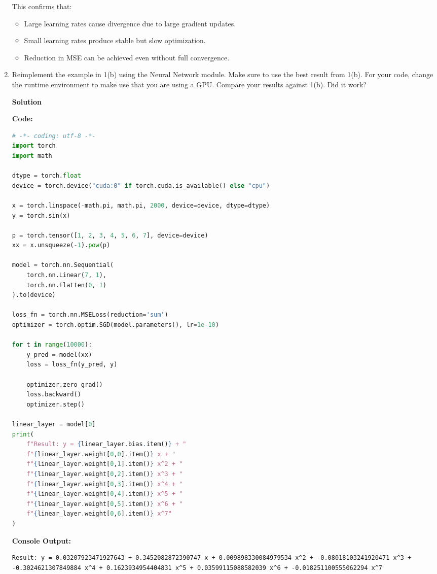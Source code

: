 \documentclass[10pt]{article}
\begin{document}
\begin{enumerate}[label=\textbf{1(\alph*)}]
This confirms that:
\begin{itemize}
    \item Large learning rates cause divergence due to large gradient updates.
    \item Small learning rates produce stable but slow optimization.
    \item Reduction in MSE can be achieved even without full convergence.
\end{itemize}

\newpage
    \item Reimplement the example in 1(b) using the Neural Network module. Make sure to use the best result from 1(b). For your code, change the runtime environment to make use that you are using a GPU. Compare your results against 1(b). Did it work?

\textbf{Solution}

\textbf{Code:}
\begin{lstlisting}[language=Python]
# -*- coding: utf-8 -*-
import torch
import math

dtype = torch.float
device = torch.device("cuda:0" if torch.cuda.is_available() else "cpu")

x = torch.linspace(-math.pi, math.pi, 2000, device=device, dtype=dtype)
y = torch.sin(x)

p = torch.tensor([1, 2, 3, 4, 5, 6, 7], device=device)
xx = x.unsqueeze(-1).pow(p)

model = torch.nn.Sequential(
    torch.nn.Linear(7, 1),
    torch.nn.Flatten(0, 1)
).to(device)

loss_fn = torch.nn.MSELoss(reduction='sum')
optimizer = torch.optim.SGD(model.parameters(), lr=1e-10)

for t in range(10000):
    y_pred = model(xx)
    loss = loss_fn(y_pred, y)

    optimizer.zero_grad()
    loss.backward()
    optimizer.step()

linear_layer = model[0]
print(
    f"Result: y = {linear_layer.bias.item()} + "
    f"{linear_layer.weight[0,0].item()} x + "
    f"{linear_layer.weight[0,1].item()} x^2 + "
    f"{linear_layer.weight[0,2].item()} x^3 + "
    f"{linear_layer.weight[0,3].item()} x^4 + "
    f"{linear_layer.weight[0,4].item()} x^5 + "
    f"{linear_layer.weight[0,5].item()} x^6 + "
    f"{linear_layer.weight[0,6].item()} x^7"
)
\end{lstlisting}

\textbf{Console Output:}
\begin{lstlisting}
Result: y = 0.03207923471927643 + 0.3452082872390747 x + 0.009898330084979534 x^2 + -0.08018103241920471 x^3 + -0.3024621307849884 x^4 + 0.1623934954404831 x^5 + 0.03599115088582039 x^6 + -0.018251100555062294 x^7
\end{lstlisting}


\end{enumerate}
\end{document}
